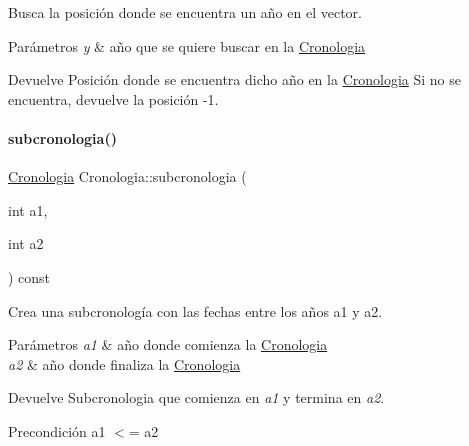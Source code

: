 Busca la posición donde se encuentra un año en el vector. 


\begin{DoxyParams}{Parámetros}
{\em y} & año que se quiere buscar en la {\ttfamily \hyperlink{classCronologia}{Cronologia}} \\
\hline
\end{DoxyParams}
\begin{DoxyReturn}{Devuelve}
Posición donde se encuentra dicho año en la {\ttfamily \hyperlink{classCronologia}{Cronologia}} Si no se encuentra, devuelve la posición -\/1. 
\end{DoxyReturn}
\mbox{\label{classCronologia_a96a1e1d8eb1e51f09f1488e9100e2ed5}} 
\paragraph{\texorpdfstring{subcronologia()}{subcronologia()}\hspace{0.1cm}{\footnotesize\ttfamily [1/2]}}
{\footnotesize\ttfamily \hyperlink{classCronologia}{Cronologia} Cronologia\+::subcronologia (\begin{DoxyParamCaption}\item[{int}]{a1,  }\item[{int}]{a2 }\end{DoxyParamCaption}) const}



Crea una subcronología con las fechas entre los años a1 y a2. 


\begin{DoxyParams}{Parámetros}
{\em a1} & año donde comienza la {\ttfamily \hyperlink{classCronologia}{Cronologia}} \\
\hline
{\em a2} & año donde finaliza la {\ttfamily \hyperlink{classCronologia}{Cronologia}} \\
\hline
\end{DoxyParams}
\begin{DoxyReturn}{Devuelve}
Subcronologia que comienza en {\itshape a1} y termina en {\itshape a2}. 
\end{DoxyReturn}
\begin{DoxyPrecond}{Precondición}
a1 $<$= a2 
\end{DoxyPrecond}
\mbox{\label{classCronologia_a59bc9f7828a6b9e34272c68cd49eb62c}} 
